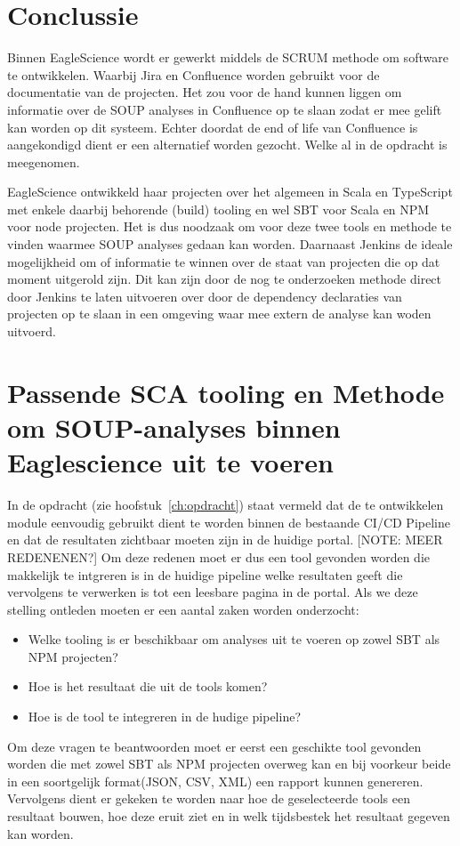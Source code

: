 \section{Conclussie}\label{sec:ESconclussie}
Binnen EagleScience wordt er gewerkt middels de SCRUM methode om software te ontwikkelen. Waarbij Jira en Confluence worden gebruikt voor de documentatie van de projecten. Het zou voor de hand kunnen liggen om informatie over de SOUP analyses in Confluence op te slaan zodat er mee gelift kan worden op dit systeem. Echter doordat de end of life van Confluence is aangekondigd dient er een alternatief worden gezocht. Welke al in de opdracht is meegenomen.

EagleScience ontwikkeld haar projecten over het algemeen in Scala en TypeScript met enkele daarbij behorende (build) tooling en wel SBT voor Scala en NPM voor node projecten. Het is dus noodzaak om voor deze twee tools en methode te vinden waarmee SOUP analyses gedaan kan worden. Daarnaast Jenkins de ideale mogelijkheid om of informatie te winnen over de staat van projecten die op dat moment uitgerold zijn. Dit kan zijn door de nog te onderzoeken methode direct door Jenkins te laten uitvoeren over door de dependency declaraties van projecten op te slaan in een omgeving waar mee extern de analyse kan woden uitvoerd.

\section{Passende SCA tooling en Methode om SOUP-analyses binnen Eaglescience uit te voeren}\label{sec:sca-tooling}
In de opdracht (zie hoofstuk~\ref{ch:opdracht}) staat vermeld dat de te ontwikkelen module eenvoudig gebruikt dient te worden binnen de bestaande CI/CD Pipeline en dat de resultaten zichtbaar moeten zijn in de huidige portal. [NOTE: MEER REDENENEN?] Om deze redenen moet er dus een tool gevonden worden die makkelijk te intgreren is in de huidige pipeline welke resultaten geeft die vervolgens te verwerken is tot een leesbare pagina in de portal. Als we deze stelling ontleden moeten er een aantal zaken worden onderzocht:
\begin{itemize}
    \item Welke tooling is er beschikbaar om analyses uit te voeren op zowel SBT als NPM projecten?
    \item Hoe is het resultaat die uit de tools komen?
    \item Hoe is de tool te integreren in de hudige pipeline?
\end{itemize}
Om deze vragen te beantwoorden moet er eerst een geschikte tool gevonden worden die met zowel SBT als NPM projecten overweg kan en bij voorkeur beide in een soortgelijk format(JSON, CSV, XML) een rapport kunnen genereren. Vervolgens dient er gekeken te worden naar hoe de geselecteerde tools een resultaat bouwen, hoe deze eruit ziet en in welk tijdsbestek het resultaat gegeven kan worden.

